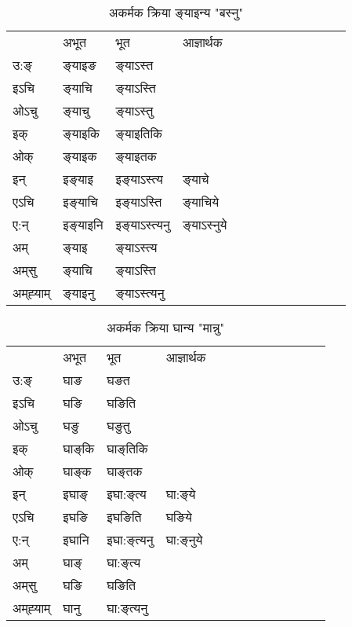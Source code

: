 \begin{table}[H]
\centering
\caption{\label{ɛn.vi} अकर्मक क्रिया  ङ्‌याइन्य  "बस्नु"  }
\begin{tabular}{l|l|l|l|l|l|l|l|l|l|l|l|l}  \toprule
&अभूत & भूत & आज्ञार्थक \\ 
उ:ङ्‌ &ङ्‌याइङ &ङ्‌याऽस्त \\ 
इऽचि &ङ्‌याचि &ङ्‌याऽस्ति   \\ 
ओऽचु &ङ्‌याचु &ङ्‌याऽस्तु   \\ 
इक् &ङ्‌याइकि &ङ्‌याइतिकि   \\ 
ओक् &ङ्‌याइक &ङ्‌याइतक   \\ 
इन् & इङ्‌याइ & इङ्‌याऽस्त्य &ङ्‌याचे  \\ 
एऽचि & इङ्‌याचि & इङ्‌याऽस्ति &ङ्‌याचिये    \\ 
ए:न् & इङ्‌याइनि  & इङ्‌याऽस्त्यनु &ङ्‌याऽस्‍नुये  \\ 
अम् & ङ्‌याइ & ङ्‌याऽस्त्य   \\ 
अम्‌सु & ङ्‌याचि & ङ्‌याऽस्ति   \\ 
अम्‌ह्‍याम् & ङ्‌याइनु  & ङ्‌याऽस्त्यनु \\ 
\bottomrule
\end{tabular}
\end{table}


\begin{table}[H]
\centering
\caption{\label{aŋ.vi} अकर्मक क्रिया  घान्य  "मान्नु"  }
\begin{tabular}{l|l|l|l|l|l|l|l|l|l|l|l|l}  \toprule
&अभूत & भूत & आज्ञार्थक \\ 
उ:ङ्‌ &घाङ &घङत \\ 
इऽचि &घङि &घङिति   \\ 
ओऽचु &घङु &घङुतु   \\ 
इक् &घाङ्‌कि &घाङ्‌तिकि   \\ 
ओक् &घाङ्‌क &घाङ्‌तक   \\ 
इन् & इघाङ्‌ & इघा:ङ्‌त्य &घा:ङ्‌ये  \\ 
एऽचि & इघङि & इघङिति &घङिये    \\ 
ए:न् & इघानि  & इघा:ङ्‌त्यनु &घा:ङ्‌नुये  \\ 
अम् & घाङ्‌ & घा:ङ्‌त्य   \\ 
अम्‌सु & घङि & घङिति   \\ 
अम्‌ह्‍याम् & घानु  & घा:ङ्‌त्यनु \\ 
\bottomrule
\end{tabular}
\end{table}


